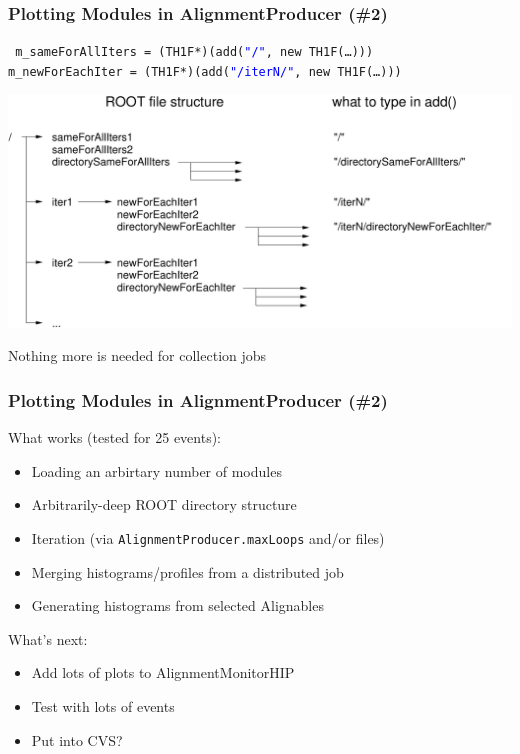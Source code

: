 \documentclass[compress]{beamer}
\begin{document}
\begin{frame}
\frametitle{Plotting Modules in AlignmentProducer (\#2)}
\begin{minipage}{\linewidth}
\tt \small
m\_sameForAllIters = (TH1F*)(add(\textcolor{blue}{"/"}, new TH1F(\ldots))) \\
m\_newForEachIter = (TH1F*)(add(\textcolor{blue}{"/iterN/"}, new TH1F(\ldots))) \\
\end{minipage}

\vfill
\includegraphics[width=\linewidth]{rootfile}

\vfill
Nothing more is needed for collection jobs
\end{frame}

\begin{frame}
\frametitle{Plotting Modules in AlignmentProducer (\#2)}
What works (tested for 25 events):
\begin{itemize}
  \item Loading an arbirtary number of modules
  \item Arbitrarily-deep ROOT directory structure
  \item Iteration (via {\tt AlignmentProducer.maxLoops} and/or files)
  \item Merging histograms/profiles from a distributed job
  \item Generating histograms from selected Alignables
\end{itemize}

\vfill
What's next:
\begin{itemize}
  \item Add lots of plots to AlignmentMonitorHIP
  \item Test with lots of events
  \item Put into CVS?
\end{itemize}
\end{frame}
\end{document}
